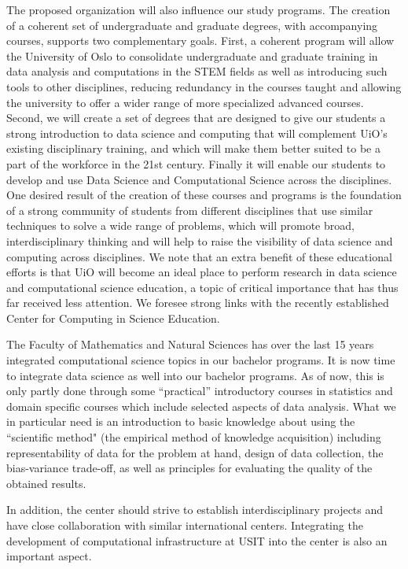 \documentclass[a4paper,10pt]{article}
\begin{document}
The proposed organization will also influence our study programs.  The
creation of a coherent set of undergraduate and graduate degrees, with
accompanying courses, supports two complementary goals. First, a
coherent program will allow the University of Oslo to consolidate
undergraduate and graduate training in data analysis and computations
in the STEM fields as well as introducing such tools to other
disciplines, reducing redundancy in the courses taught and allowing
the university to offer a wider range of more specialized advanced
courses. Second, we will create a set of degrees that are designed to
give our students a strong introduction to data science and computing
that will complement UiO’s existing disciplinary training, and which
will make them better suited to be a part of the workforce in the 21st
century. Finally it will enable our students to develop and use Data
Science and Computational Science across the disciplines.  One desired
result of the creation of these courses and programs is the foundation
of a strong community of students from different disciplines that use
similar techniques to solve a wide range of problems, which will
promote broad, interdisciplinary thinking and will help to raise the
visibility of data science and computing across disciplines.  We note
that an extra benefit of these educational efforts is that UiO will
become an ideal place to perform research in data science and
computational science education, a topic of critical importance that
has thus far received less attention. We foresee strong links with the
recently established Center for Computing in Science Education.

The Faculty of Mathematics and Natural Sciences has over the last 15
years integrated computational science topics in our bachelor
programs. It is now time to integrate data science as well into our
bachelor programs. As of now, this is only partly done through some
“practical” introductory courses in statistics and domain specific
courses which include selected aspects of data analysis. What we in
particular need is an introduction to basic knowledge about using the
“scientific method" (the empirical method of knowledge acquisition)
including representability of data for the problem at hand, design of
data collection, the bias-variance trade-off, as well as principles
for evaluating the quality of the obtained results.

In addition, the center should strive to establish interdisciplinary
projects and have close collaboration with similar international
centers.  Integrating the development of computational infrastructure
at USIT into the center is also an important aspect.
\end{document}
